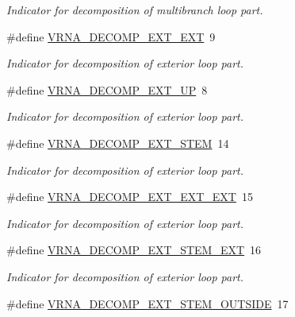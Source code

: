 \begin{DoxyCompactItemize}
\begin{DoxyCompactList}\small\item\em Indicator for decomposition of multibranch loop part. \end{DoxyCompactList}\item 
\#define \hyperlink{group__constraints_ga437adf5115c1999304eff26b41e4c9b6}{V\+R\+N\+A\+\_\+\+D\+E\+C\+O\+M\+P\+\_\+\+E\+X\+T\+\_\+\+E\+X\+T}~9
\begin{DoxyCompactList}\small\item\em Indicator for decomposition of exterior loop part. \end{DoxyCompactList}\item 
\#define \hyperlink{group__constraints_gaff1ddaffe86d984623910b40cc8a8717}{V\+R\+N\+A\+\_\+\+D\+E\+C\+O\+M\+P\+\_\+\+E\+X\+T\+\_\+\+U\+P}~8
\begin{DoxyCompactList}\small\item\em Indicator for decomposition of exterior loop part. \end{DoxyCompactList}\item 
\#define \hyperlink{group__constraints_gae44b5ace0d9b4a29088069ecb4cec441}{V\+R\+N\+A\+\_\+\+D\+E\+C\+O\+M\+P\+\_\+\+E\+X\+T\+\_\+\+S\+T\+E\+M}~14
\begin{DoxyCompactList}\small\item\em Indicator for decomposition of exterior loop part. \end{DoxyCompactList}\item 
\#define \hyperlink{group__constraints_ga803bd818b3f4b2b0a4a5cfa2f7dc2045}{V\+R\+N\+A\+\_\+\+D\+E\+C\+O\+M\+P\+\_\+\+E\+X\+T\+\_\+\+E\+X\+T\+\_\+\+E\+X\+T}~15
\begin{DoxyCompactList}\small\item\em Indicator for decomposition of exterior loop part. \end{DoxyCompactList}\item 
\#define \hyperlink{group__constraints_gabb09c5b78b75a44502fc77b950125c1e}{V\+R\+N\+A\+\_\+\+D\+E\+C\+O\+M\+P\+\_\+\+E\+X\+T\+\_\+\+S\+T\+E\+M\+\_\+\+E\+X\+T}~16
\begin{DoxyCompactList}\small\item\em Indicator for decomposition of exterior loop part. \end{DoxyCompactList}\item 
\hypertarget{group__constraints_gae7554cd3ff089360c02e4920229e221c}{}\#define \hyperlink{group__constraints_gae7554cd3ff089360c02e4920229e221c}{V\+R\+N\+A\+\_\+\+D\+E\+C\+O\+M\+P\+\_\+\+E\+X\+T\+\_\+\+S\+T\+E\+M\+\_\+\+O\+U\+T\+S\+I\+D\+E}~17\label{group__constraints_gae7554cd3ff089360c02e4920229e221c}


\end{DoxyCompactItemize}
